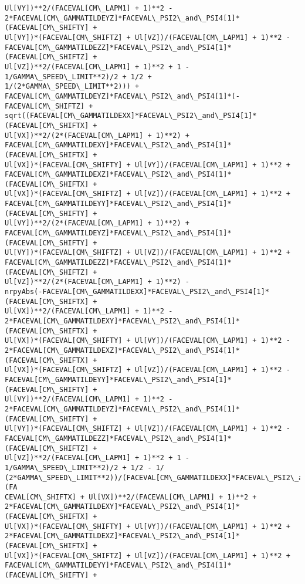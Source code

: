 \documentclass[landscape,letterpaper,10pt,english]{article}
\begin{document}
\begin{Verbatim}[commandchars=\\\{\}]
Ul[VY])**2/(FACEVAL[CM\_LAPM1] + 1)**2 -
2*FACEVAL[CM\_GAMMATILDEYZ]*FACEVAL\_PSI2\_and\_PSI4[1]*(FACEVAL[CM\_SHIFTY] +
Ul[VY])*(FACEVAL[CM\_SHIFTZ] + Ul[VZ])/(FACEVAL[CM\_LAPM1] + 1)**2 -
FACEVAL[CM\_GAMMATILDEZZ]*FACEVAL\_PSI2\_and\_PSI4[1]*(FACEVAL[CM\_SHIFTZ] +
Ul[VZ])**2/(FACEVAL[CM\_LAPM1] + 1)**2 + 1 - 1/GAMMA\_SPEED\_LIMIT**2)/2 + 1/2 +
1/(2*GAMMA\_SPEED\_LIMIT**2))) +
FACEVAL[CM\_GAMMATILDEYZ]*FACEVAL\_PSI2\_and\_PSI4[1]*(-FACEVAL[CM\_SHIFTZ] +
sqrt((FACEVAL[CM\_GAMMATILDEXX]*FACEVAL\_PSI2\_and\_PSI4[1]*(FACEVAL[CM\_SHIFTX] +
Ul[VX])**2/(2*(FACEVAL[CM\_LAPM1] + 1)**2) +
FACEVAL[CM\_GAMMATILDEXY]*FACEVAL\_PSI2\_and\_PSI4[1]*(FACEVAL[CM\_SHIFTX] +
Ul[VX])*(FACEVAL[CM\_SHIFTY] + Ul[VY])/(FACEVAL[CM\_LAPM1] + 1)**2 +
FACEVAL[CM\_GAMMATILDEXZ]*FACEVAL\_PSI2\_and\_PSI4[1]*(FACEVAL[CM\_SHIFTX] +
Ul[VX])*(FACEVAL[CM\_SHIFTZ] + Ul[VZ])/(FACEVAL[CM\_LAPM1] + 1)**2 +
FACEVAL[CM\_GAMMATILDEYY]*FACEVAL\_PSI2\_and\_PSI4[1]*(FACEVAL[CM\_SHIFTY] +
Ul[VY])**2/(2*(FACEVAL[CM\_LAPM1] + 1)**2) +
FACEVAL[CM\_GAMMATILDEYZ]*FACEVAL\_PSI2\_and\_PSI4[1]*(FACEVAL[CM\_SHIFTY] +
Ul[VY])*(FACEVAL[CM\_SHIFTZ] + Ul[VZ])/(FACEVAL[CM\_LAPM1] + 1)**2 +
FACEVAL[CM\_GAMMATILDEZZ]*FACEVAL\_PSI2\_and\_PSI4[1]*(FACEVAL[CM\_SHIFTZ] +
Ul[VZ])**2/(2*(FACEVAL[CM\_LAPM1] + 1)**2) -
nrpyAbs(-FACEVAL[CM\_GAMMATILDEXX]*FACEVAL\_PSI2\_and\_PSI4[1]*(FACEVAL[CM\_SHIFTX] +
Ul[VX])**2/(FACEVAL[CM\_LAPM1] + 1)**2 -
2*FACEVAL[CM\_GAMMATILDEXY]*FACEVAL\_PSI2\_and\_PSI4[1]*(FACEVAL[CM\_SHIFTX] +
Ul[VX])*(FACEVAL[CM\_SHIFTY] + Ul[VY])/(FACEVAL[CM\_LAPM1] + 1)**2 -
2*FACEVAL[CM\_GAMMATILDEXZ]*FACEVAL\_PSI2\_and\_PSI4[1]*(FACEVAL[CM\_SHIFTX] +
Ul[VX])*(FACEVAL[CM\_SHIFTZ] + Ul[VZ])/(FACEVAL[CM\_LAPM1] + 1)**2 -
FACEVAL[CM\_GAMMATILDEYY]*FACEVAL\_PSI2\_and\_PSI4[1]*(FACEVAL[CM\_SHIFTY] +
Ul[VY])**2/(FACEVAL[CM\_LAPM1] + 1)**2 -
2*FACEVAL[CM\_GAMMATILDEYZ]*FACEVAL\_PSI2\_and\_PSI4[1]*(FACEVAL[CM\_SHIFTY] +
Ul[VY])*(FACEVAL[CM\_SHIFTZ] + Ul[VZ])/(FACEVAL[CM\_LAPM1] + 1)**2 -
FACEVAL[CM\_GAMMATILDEZZ]*FACEVAL\_PSI2\_and\_PSI4[1]*(FACEVAL[CM\_SHIFTZ] +
Ul[VZ])**2/(FACEVAL[CM\_LAPM1] + 1)**2 + 1 - 1/GAMMA\_SPEED\_LIMIT**2)/2 + 1/2 - 1/
(2*GAMMA\_SPEED\_LIMIT**2))/(FACEVAL[CM\_GAMMATILDEXX]*FACEVAL\_PSI2\_and\_PSI4[1]*(FA
CEVAL[CM\_SHIFTX] + Ul[VX])**2/(FACEVAL[CM\_LAPM1] + 1)**2 +
2*FACEVAL[CM\_GAMMATILDEXY]*FACEVAL\_PSI2\_and\_PSI4[1]*(FACEVAL[CM\_SHIFTX] +
Ul[VX])*(FACEVAL[CM\_SHIFTY] + Ul[VY])/(FACEVAL[CM\_LAPM1] + 1)**2 +
2*FACEVAL[CM\_GAMMATILDEXZ]*FACEVAL\_PSI2\_and\_PSI4[1]*(FACEVAL[CM\_SHIFTX] +
Ul[VX])*(FACEVAL[CM\_SHIFTZ] + Ul[VZ])/(FACEVAL[CM\_LAPM1] + 1)**2 +
FACEVAL[CM\_GAMMATILDEYY]*FACEVAL\_PSI2\_and\_PSI4[1]*(FACEVAL[CM\_SHIFTY] +

\end{Verbatim}
\end{document}
